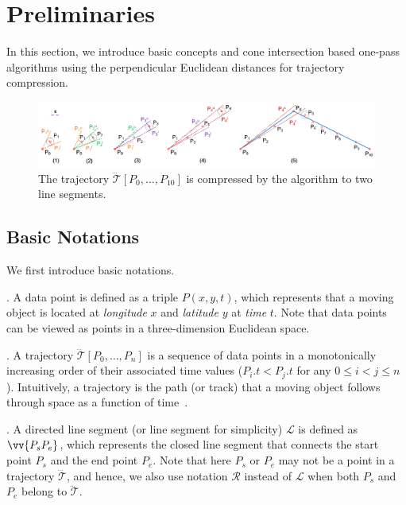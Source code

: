 \section{Preliminaries}
In this section, we introduce basic concepts and cone intersection based one-pass algorithms using the perpendicular Euclidean distances for trajectory compression.


\begin{figure}[tb!]
\centering
\includegraphics[scale=0.8]{figures/Fig-sleeve.png}
\vspace{-2.5ex}
\caption{\small The trajectory $\dddot{\mathcal{T}}[P_0, \ldots, P_{10}]$ is compressed by the \conei algorithm to two line segments.}
\vspace{-2ex}
\label{fig:sleeve}
\end{figure}



\subsection{Basic Notations}

We first introduce basic notations.

. A data point is defined as a triple $P(x, y, t)$, which represents that a moving object is located at {\em longitude} $x$ and {\em latitude} $y$ at {\em time} $t$. Note that data points can be viewed as points in a three-dimension Euclidean space.

. A trajectory $\dddot{\mathcal{T}}[P_0, \ldots, P_n]$ is a sequence of data points in a monotonically increasing order of their associated time values (\ie $P_i.t < P_j.t$ for any $0\le i<j\le n$). Intuitively, a trajectory is the path (or track) that a moving object follows through space as a function of time~\cite{physics-trajectory}.


. A directed line segment (or line segment for simplicity) $\mathcal{L}$ is defined as $\vv{P_{s}P_{e}}$, which represents the closed line segment that connects the start point $P_s$ and the end point $P_e$.
Note that here $P_s$ or $P_e$ may not be a point in a trajectory $\dddot{\mathcal{T}}$, and hence, we also use notation $\mathcal{R}$ instead of $\mathcal{L}$ when both $P_s$ and $P_e$ belong to $\dddot{\mathcal{T}}$.

